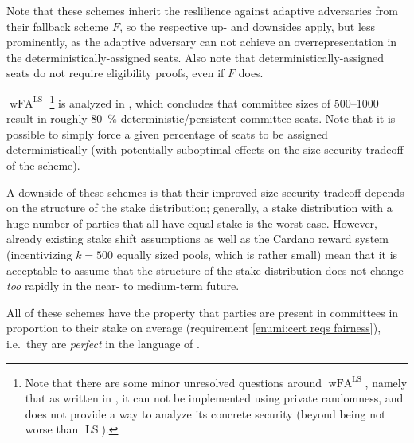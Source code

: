 \begin{enumerate}
  Note that these schemes inherit the reslilience against adaptive adversaries from their fallback scheme $F$, so the respective up- and downsides apply, but less prominently, as the adaptive adversary can not achieve an overrepresentation in the deterministically-assigned seats.
  Also note that deterministically-assigned seats do not require eligibility proofs, even if $F$ does.

  $\operatorname{wFA}^{\operatorname{LS}}$%
  \footnote{Note that there are some minor unresolved questions around $\operatorname{wFA}^{\operatorname{LS}}$, namely that as written in \cite{gavzi2023fait}, it can not be implemented using private randomness, and \cite{gavzi2023fait} does not provide a way to analyze its concrete security (beyond being not worse than $\operatorname{LS}$).}
  is analyzed in \cite{peras-cert-report}, which concludes that committee sizes of \numrange{500}{1000} result in roughly \qty{80}{\percent} deterministic/persistent committee seats.
  Note that it is possible to simply force a given percentage of seats to be assigned deterministically (with potentially suboptimal effects on the size-security-tradeoff of the scheme).

  A downside of these schemes is that their improved size-security tradeoff depends on the structure of the stake distribution; generally, a stake distribution with a huge number of parties that all have equal stake is the worst case.
  However, already existing stake shift assumptions as well as the Cardano reward system (incentivizing $k = 500$ equally sized pools, which is rather small) mean that it is acceptable to assume that the structure of the stake distribution does not change \emph{too} rapidly in the near- to medium-term future.
\end{enumerate}

All of these schemes have the property that parties are present in committees in proportion to their stake on average (requirement \ref{enumi:cert reqs fairness}), i.e.\ they are \emph{perfect} in the language of \cite{gavzi2023fait}.

